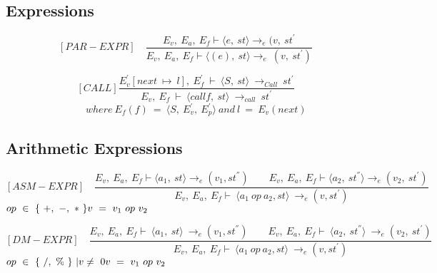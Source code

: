    	\subsection{Expressions}
   	
   	\[
   	[PAR-EXPR] \quad
   	\dfrac{E_v, \ E_a, \ E_f \vdash \langle e, \ st \rangle \rightarrow_e (v, \ st^{'}}{E_v, \ E_a, \ E_f \vdash \langle (e), \ st \rangle \rightarrow_e \ (v, \ st^{'})}
   	\]
   	
	\[
	[CALL]
	\dfrac{E_v^{'}[next \ \mapsto \ l], \ E_f^{'} \ \vdash \ \langle S, \ st \rangle \ \rightarrow_{Call} \ st^{'}}{E_v, \ E_f \ \vdash \ \langle call f, \ st \rangle \ \rightarrow_{call} \ st^{'}}
	\]
	\begin{math}		
		\qquad \qquad \qquad \qquad where \ E_f(f) \ = \ \langle S, \ E_v^{'}, \ E_p^{'} \rangle \
		and \ l \ = \ E_v(next)
	\end{math}
   	
   	\subsection{Arithmetic Expressions}
   	
   	\[
   	[ASM-EXPR] \quad
   	\dfrac{E_v, \ E_a, \ E_f \vdash \langle a_1, \ st \rangle \rightarrow_{e} (v_1, st^{''}) \qquad E_v, \ E_a, \ E_f \vdash \langle a_2, \ st^{''}\rangle \rightarrow_e (v_2, \ st^{'})}{E_v, \ E_a, \ E_f \vdash \ \langle a_1 \ op \ a_2, st \rangle \ \rightarrow_{e} (v, st^{'})}
   	\]
 	\begin{math}
 	op \ \in \ \{ \ +, \ -, \ * \ \} \newline
   	v \ = \ v_1 \ op \ v_2
   	\end{math}
   	
   	\[
   	[DM-EXPR] \quad
   	\dfrac{E_v, \ E_a, \ E_f \vdash \ \langle a_1, \ st \rangle \ \rightarrow_{e} (v_1, st^{''}) \qquad E_v, \ E_a, \ E_f \vdash \ \langle a_2, \ st^{''} \rangle \ \rightarrow_e (v_2, \ st^{'})}{E_v, \ E_a, \ E_f \vdash \ \langle a_1 \ op \ a_2, st \rangle \ \rightarrow_{e} (v, st^{'})}
   	\]
   	\begin{math}
   	op \ \in \ \{ \ /, \ \% \ \} \ | v \not= \ 0 \newline 
   	v \ = \ v_1 \ op \ v_2
   	\end{math}   	   	   	


